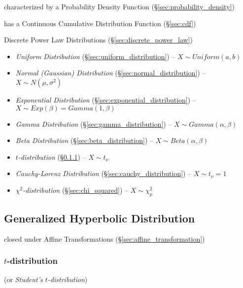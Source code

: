 characterized by a Probability Density Function
(\S\ref{sec:probability_density})

has a Continuous Cumulative Distribution Function (\S\ref{sec:cdf})

\fist Discrete Power Law Distributions
(\S\ref{sec:discrete_power_law})

\begin{itemize}
  \item \emph{Uniform Distribution} (\S\ref{sec:uniform_distribution}) --
    $X \sim Uniform(a,b)$
  \item \emph{Normal (Gaussian) Distribution} (\S\ref{sec:normal_distribution})
    -- $X \sim N(\mu, \sigma^2)$
  \item \emph{Exponential Distribution} (\S\ref{sec:exponential_distribution})
    -- $X \sim Exp(\beta) = Gamma(1, \beta)$
  \item \emph{Gamma Distribution} (\S\ref{sec:gamma_distribution})
    -- $X \sim Gamma(\alpha, \beta)$
  \item \emph{Beta Distribution} (\S\ref{sec:beta_distribution})
    -- $X \sim Beta(\alpha, \beta)$
  \item \emph{$t$-distribution} (\S\ref{sec:t_distribution})
    -- $X \sim t_\nu$
  \item \emph{Cauchy-Lorenz Distribution} (\S\ref{sec:cauchy_distribution})
    -- $X \sim t_\nu=1$
  \item \emph{$\chi^2$-distribution} (\S\ref{sec:chi_squared})
    -- $X \sim \chi^2_p$
\end{itemize}



\subsection{Generalized Hyperbolic Distribution}
\label{sec:generalized_hyperbolic}

closed under Affine Transformations (\S\ref{sec:affine_transformation})



\subsubsection{$t$-distribution}\label{sec:t_distribution}

(or \emph{Student's $t$-distribution})

